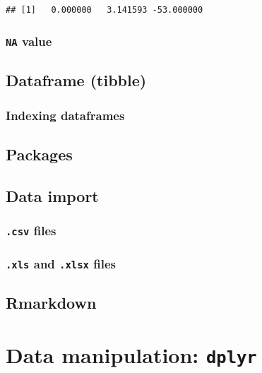 \documentclass[
]{book}
\begin{document}
\begin{verbatim}
## [1]   0.000000   3.141593 -53.000000
\end{verbatim}

\hypertarget{na-value}{%
\subsection{\texorpdfstring{\texttt{NA} value}{NA value}}\label{na-value}}

\hypertarget{dataframe-tibble}{%
\section{Dataframe (tibble)}\label{dataframe-tibble}}

\hypertarget{indexing-dataframes}{%
\subsection{Indexing dataframes}\label{indexing-dataframes}}

\hypertarget{packages}{%
\section{Packages}\label{packages}}

\hypertarget{data-import}{%
\section{Data import}\label{data-import}}

\hypertarget{csv-files}{%
\subsection{\texorpdfstring{\texttt{.csv} files}{.csv files}}\label{csv-files}}

\hypertarget{xls-and-.xlsx-files}{%
\subsection{\texorpdfstring{\texttt{.xls} and \texttt{.xlsx} files}{.xls and .xlsx files}}\label{xls-and-.xlsx-files}}

\hypertarget{rmarkdown}{%
\section{Rmarkdown}\label{rmarkdown}}

\hypertarget{dplyr}{%
\chapter{\texorpdfstring{Data manipulation: \texttt{dplyr}}{Data manipulation: dplyr}}\label{dplyr}}
\end{document}
